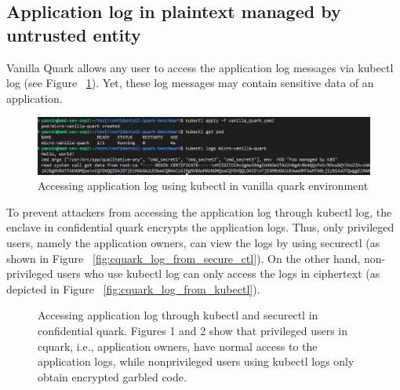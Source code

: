 \subsection{Application log in plaintext managed by untrusted entity}
Vanilla Quark allows any user to access the application log messages via kubectl log\cite*{kubectl} (see Figure ~\ref{fig:vanilla_queak_app_log}). 
Yet, these log messages may contain sensitive data of an application.
\begin{figure}[H]
    \centering
    \includegraphics[width=1\textwidth]{images/vanilla_queak_app_log.png}
    \caption[Accessing application log using kubectl in vanilla quark environment]{Accessing application log using kubectl in vanilla quark environment}
    \label{fig:vanilla_queak_app_log}
\end{figure}

To prevent attackers from accessing the application log through kubectl log\cite*{kubectl}, the enclave in confidential quark encrypts the application logs. Thus, only privileged users, namely the application owners, can view the logs by using securectl (as shown in Figure ~\ref{fig:cquark_log_from_secure_ctl}).
 On the other hand, non-privileged users who use kubectl log can only access the logs in ciphertext (as depicted in Figure ~\ref{fig:cquark_log_from_kubectl}).

\begin{figure}[H]

    
    
    \caption[Accessing application log through kubectl and securectl in confidential quark]{Accessing application log through kubectl and securectl in confidential quark. Figures 1 and 2 show that privileged users in cquark, i.e., 
    application owners, have normal access to the application logs, while non\-privileged users using kubectl logs only obtain encrypted garbled code.}
\end{figure}

